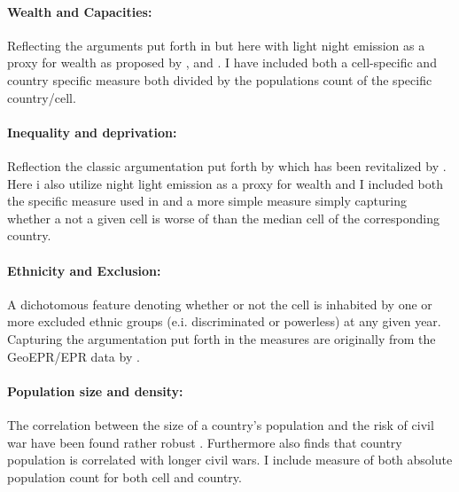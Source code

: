 \documentclass[a4paper]{article}
\begin{document}
\paragraph{Wealth and Capacities:} Reflecting the arguments put forth in \cite{Collier_Hoeffler_1998, Fearon_Laitin_2003, Collier_Hoeffler_2004} but here with light night emission as a proxy for wealth as proposed by \cite{Elvidge_2009}, \cite{Chen_Nordhuas_2011} and \cite{Cederman_Gleditsch_Buhaug_2013}. I have included both a cell-specific and country specific measure both divided by the populations count of the specific country/cell.\par

\paragraph{Inequality and deprivation:} Reflection the classic argumentation put forth by \cite{Gurr_1970} which has been revitalized by \cite{Cederman_Gleditsch_Buhaug_2013}. Here i also utilize night light emission as a proxy for wealth and I included both the specific measure used in \cite{Cederman_Gleditsch_Buhaug_2013} and a more simple measure simply capturing whether a not a given cell is worse of than the median cell of the corresponding country.\par

\paragraph{Ethnicity and Exclusion:} A dichotomous feature denoting whether or not the cell is inhabited by one or more excluded ethnic groups (e.i.  discriminated or powerless) at any given year. Capturing the argumentation put forth in \cite{Cederman_Weidmann_Gleditsch_2011, Cederman_Gleditsch_Buhaug_2013} the measures are originally from the GeoEPR/EPR data by \cite{Vogt_2015}.\par

\paragraph{Population size and density:} The correlation between the size of a country's population and the risk of civil war have been found rather robust \citep{Collier_Hoeffler_1998, Fearon_Laitin_2003, Collier_Hoeffler_2004, Hegre_Sambanis_2006}. Furthermore \cite[287]{Fearon_2004} also finds that country population is correlated with longer civil wars. I include measure of both absolute population count for both cell and country.\par 
\end{document}

